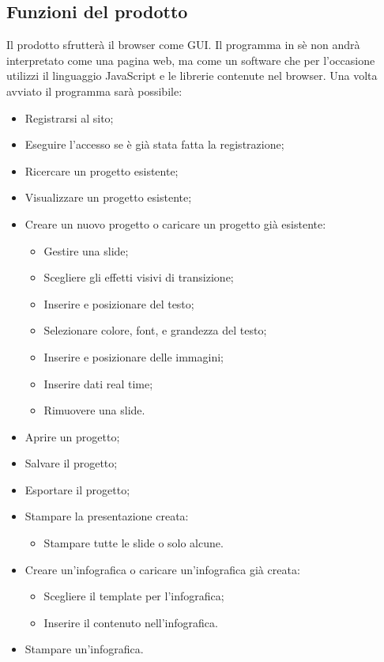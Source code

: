 \subsection{Funzioni del prodotto}
Il prodotto sfrutterà il \gls{browser} come \gls{GUI}. Il programma in sè non andrà interpretato come una pagina web, ma come un software che per l'occasione utilizzi il linguaggio \gls{JavaScript} e le librerie contenute nel \gls{browser}.
Una volta avviato il programma sarà possibile:
\begin{itemize}
	\item Registrarsi al sito;
	\item Eseguire l'accesso se è già stata fatta la registrazione;
	\item Ricercare un progetto esistente;
	\item Visualizzare un progetto esistente;
	\item Creare un nuovo progetto o caricare un progetto già esistente:
	\begin{itemize}
		\item Gestire una \gls{slide};
		\item Scegliere gli effetti visivi di transizione;
		\item Inserire e posizionare del testo;
		\item Selezionare colore, \gls{font}, e grandezza del testo;
		\item Inserire e posizionare delle immagini;
		\item Inserire dati \gls{real time};
		\item Rimuovere una \gls{slide}.
	\end{itemize}
	\item Aprire un progetto;
	\item Salvare il progetto;
	\item Esportare il progetto;
	\item Stampare la presentazione creata:
	\begin{itemize}
		\item Stampare tutte le \gls{slide} o solo alcune.
	\end{itemize}
	\item Creare un'\gls{infografica} o caricare un'\gls{infografica} già creata:
	\begin{itemize}
		\item Scegliere il \gls{template} per l'\gls{infografica};
		\item Inserire il contenuto nell'\gls{infografica}.
	\end{itemize}
	\item Stampare un'\gls{infografica}.
\end{itemize}

